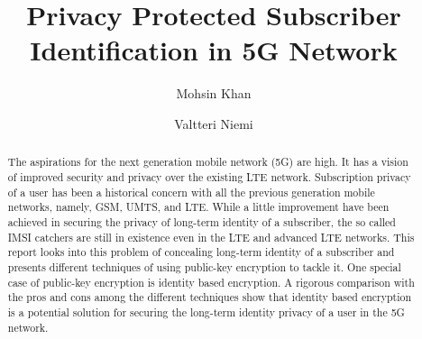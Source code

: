 \documentclass[runningheads,a4paper]{llncs} %
\begin{document}
\mainmatter  %

\title{Privacy Protected Subscriber Identification in 5G Network}



%
%
\author{Mohsin Khan%
\and Valtteri Niemi}  %


%
%

\maketitle


\begin{abstract}
The aspirations for the next generation mobile network (5G) are high. It has a vision of improved security and privacy over the existing LTE network. Subscription privacy of a user has been a historical concern with all the previous generation mobile networks, namely, GSM, UMTS, and LTE. While a little improvement have been achieved in securing the privacy of long-term identity of a subscriber, the so called IMSI catchers are still in existence even in the LTE and advanced LTE networks. This report looks into this problem of concealing long-term identity of a subscriber and presents different techniques of using public-key encryption to tackle it. One special case of public-key encryption is identity based encryption. A rigorous comparison with the pros and cons among the different techniques show that identity based encryption is a potential solution for securing the long-term identity privacy of a user in the 5G network.
\end{abstract}
\end{document}
